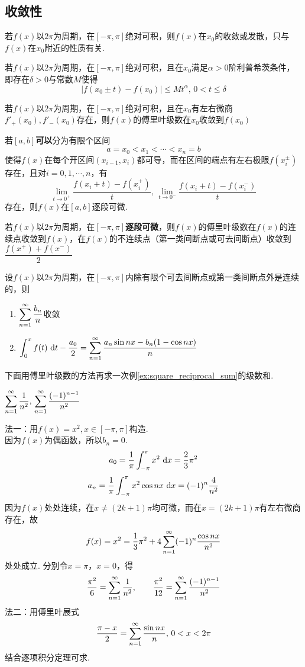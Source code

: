 \subsection{收敛性}
\begin{theorem}[黎曼局部化定理]
若$f(x)$以$2\pi$为周期，在$[-\pi,\pi]$绝对可积，则$f(x)$在$x_0$的收敛或发散，只与$f(x)$在$x_0$附近的性质有关.
\end{theorem}
\begin{theorem}
若$f(x)$以$2\pi$为周期，在$[-\pi,\pi]$绝对可积，且在$x_0$满足$\alpha>0$阶利普希茨条件，即存在$\delta>0$与常数$M$使得
\[|f(x_0\pm t)-f(x_0)|\leq Mt^\alpha,\,0<t\leq\delta\]
\end{theorem}
\begin{corollary2}
若$f(x)$以$2\pi$为周期，在$[-\pi,\pi]$绝对可积，且在$x_0$有左右微商$f'_+(x_0),f'_-(x_0)$存在，则$f(x)$的傅里叶级数在$x_0$收敛到$f(x_0)$
\end{corollary2}
\begin{definition}[逐段可微]
若$[a,b]$\textbf{可以}分为有限个区间
\[a=x_0<x_1<\cdots<x_n=b\]
使得$f(x)$在每个开区间$(x_{i-1},x_i)$都可导，而在区间的端点有左右极限$f(x_i^\pm)$存在，且对$i=0,1,\cdots,n$，有
\[\lim_{t\to 0^+}\dfrac{f(x_i+t)-f(x_i^+)}{t},\,\lim_{t\to 0^-}\dfrac{f(x_i+t)-f(x_i^-)}{t}\]
存在，则$f(x)$在$[a,b]$逐段可微.
\end{definition}
\begin{theorem}[收敛的充分条件]
若$f(x)$以$2\pi$为周期，在$[-\pi,\pi]$\textbf{逐段可微}，则$f(x)$的傅里叶级数在$f(x)$的连续点收敛到$f(x)$，在$f(x)$的不连续点（第一类间断点或可去间断点）收敛到$\dfrac{f(x^+)+f(x^-)}{2}$
\end{theorem}
\begin{theorem}[逐项积分定理]
设$f(x)$以$2\pi$为周期，在$[-\pi,\pi]$内除有限个可去间断点或第一类间断点外是连续的，则
\begin{enumerate}
	\itemsep -2pt
	\item $\displaystyle\sum_{n=1}^{\infty}\dfrac{b_n}{n}$收敛
	\item $\displaystyle\displaystyle\int_{0}^{x}{f(t)}\,\,\mathrm{d} t-\dfrac{a_0}{2}=\displaystyle\sum_{n=1}^{\infty}\dfrac{a_n\sin nx-b_n(1-\cos nx)}{n}$
\end{enumerate}
\end{theorem}
\par 下面用傅里叶级数的方法再求一次例\ref{ex:square_reciprocal_sum}的级数和.
\begin{example}
\label{ex:square_reciprocal_sum2}
$\displaystyle\sum_{n=1}^{\infty}\dfrac{1}{n^2},\,\displaystyle\sum_{n=1}^{\infty}\dfrac{(-1)^{n-1}}{n^2}$
\end{example}
\begin{analysis}
法一：用$f(x)=x^2,x\in[-\pi,\pi]$构造.\\
因为$f(x)$为偶函数，所以$b_n=0$.\\
\[a_0=\dfrac{1}{\pi}\displaystyle\int_{-\pi}^{\pi}{x^2}\,\,\mathrm{d} x=\dfrac{2}{3}\pi^2\]
\[a_n=\dfrac{1}{\pi}\displaystyle\int_{-\pi}^{\pi}{x^2\cos nx}\,\,\mathrm{d} x=(-1)^n\dfrac{4}{n^2}\]
因为$f(x)$处处连续，在$x\ne (2k+1)\pi$均可微，而在$x=(2k+1)\pi$有左右微商存在，故
\[f(x)=x^2=\dfrac{1}{3}\pi^2+4\displaystyle\sum_{n=1}^{\infty}(-1)^n\dfrac{\cos nx}{n^2}\]
处处成立. 分别令$x=\pi$，$x=0$，得
\[\dfrac{\pi^2}{6}=\displaystyle\sum_{n=1}^{\infty}\dfrac{1}{n^2},\qquad\dfrac{\pi^2}{12}=\displaystyle\sum_{n=1}^{\infty}\dfrac{(-1)^{n-1}}{n^2}\]
法二：用傅里叶展式
\[\dfrac{\pi-x}{2}=\displaystyle\sum_{n=1}^{\infty}\dfrac{\sin nx}{n},\,0<x<2\pi\]
结合逐项积分定理可求.
\end{analysis}
